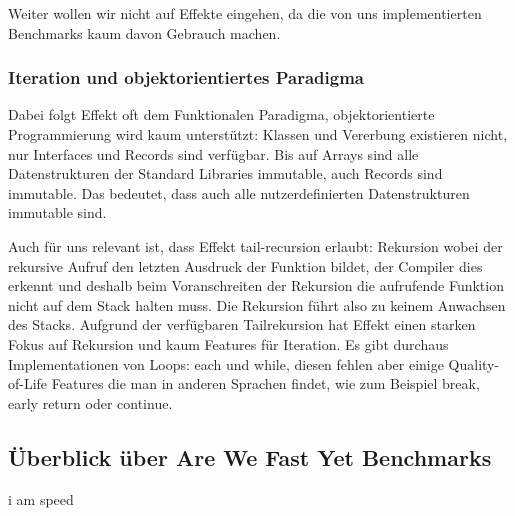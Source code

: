 Weiter wollen wir nicht auf Effekte eingehen, da die von uns implementierten Benchmarks kaum davon Gebrauch machen.

\subsubsection{ Iteration und objektorientiertes Paradigma }

Dabei folgt Effekt oft dem Funktionalen Paradigma, objektorientierte Programmierung wird kaum unterstützt:
Klassen und Vererbung existieren nicht, nur Interfaces und Records sind verfügbar.
Bis auf Arrays sind alle Datenstrukturen der Standard Libraries immutable, auch Records sind immutable. Das bedeutet, dass auch alle nutzerdefinierten Datenstrukturen immutable sind.

Auch für uns relevant ist, dass Effekt tail-recursion erlaubt: Rekursion wobei der rekursive Aufruf den letzten Ausdruck der Funktion bildet, der Compiler dies erkennt und deshalb beim Voranschreiten der Rekursion die aufrufende Funktion nicht auf dem Stack halten muss. Die Rekursion führt also zu keinem Anwachsen des Stacks. 
Aufgrund der verfügbaren Tailrekursion hat Effekt einen starken Fokus auf Rekursion und kaum Features für Iteration. Es gibt durchaus Implementationen von Loops: each und while, diesen fehlen aber einige Quality-of-Life Features die man in anderen Sprachen findet, wie zum Beispiel break, early return oder continue.

\subsection{ Überblick über Are We Fast Yet Benchmarks }
i am speed